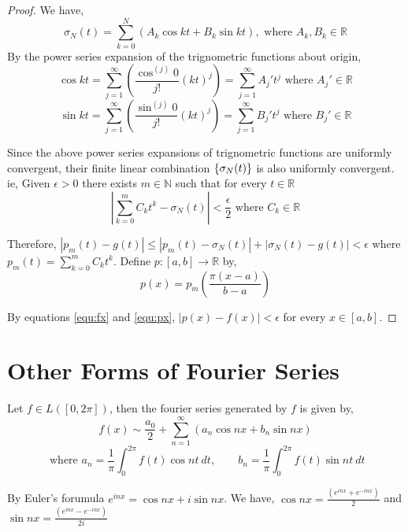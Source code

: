 \begin{proof}
		We have,
		\begin{equation}
			\sigma_N(t) = \sum_{k=0}^N \left(A_k \cos kt + B_k \sin kt \right),\text{ where } A_k, B_k \in \mathbb{R}
			\label{equ:sigmaN}
		\end{equation}
		By the power series expansion of the trignometric functions about origin,
		\begin{equation}
			\cos kt = \sum_{j = 1}^\infty \left(\frac{\cos^{(j)} 0}{j!} (kt)^j \right)  = \sum_{j = 1}^\infty A_j' t^j \text{ where } A_j' \in \mathbb{R}
			\label{equ:coskt}
		\end{equation}
		\begin{equation}
			\sin kt = \sum_{j = 1}^\infty \left(\frac{\sin^{(j)} 0}{j!} (kt)^j \right)  = \sum_{j = 1}^\infty B_j' t^j \text{ where } B_j' \in \mathbb{R}
			\label{equ:sinkt}
		\end{equation}

		Since the above power series expansions of trignometric functions are uniformly convergent, their finite linear combination \(\{\sigma_N(t)\}\) is also uniformly convergent. ie, Given \(\epsilon > 0\) there exists \(m \in \mathbb{N}\) such that for every \(t \in \mathbb{R}\)
		\[\left|\sum_{k = 0}^m C_k t^k - \sigma_N(t)\right| < \frac{\epsilon}{2} \text{ where } C_k \in \mathbb{R}\]

		Therefore, \(| p_m(t) - g(t)| \le | p_m(t) - \sigma_N(t) | + |\sigma_N(t) - g(t)| < \epsilon\) where \(p_m(t) = \sum_{k = 0}^m C_k t^k\). Define \(p : [a,b] \to \mathbb{R}\) by,
		\begin{equation}
			p(x) = p_m\left( \frac{\pi(x-a)}{b-a} \right)
			\label{equ:px}
		\end{equation}

		By equations \ref{equ:fx} and \ref{equ:px}, \(|p(x)-f(x)| < \epsilon\) for every \(x \in [a,b]\).
	\end{proof}
\section{Other Forms of Fourier Series}
	Let \(f \in L([0,2\pi])\), then the fourier series generated by $f$ is given by,
	\[ f(x) \sim \frac{a_0}{2}+\sum_{n=1}^\infty \left( a_n \cos nx + b_n \sin nx \right) \]
	\[ \text{ where } a_n = \frac{1}{\pi} \int_0^{2\pi} f(t) \cos nt\ dt,\qquad b_n = \frac{1}{\pi} \int_0^{2\pi} f(t) \sin nt\ dt \]

	By Euler's forumula \(e^{inx} = \cos nx + i\sin nx\). We have, \(\cos nx = \frac{(e^{inx}+e^{-inx})}{2}\) and \(\sin nx = \frac{(e^{inx}-e^{-inx})}{2i}\)

